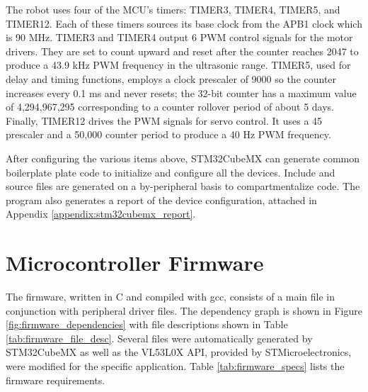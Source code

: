 The robot uses four of the MCU's timers: TIMER3, TIMER4, TIMER5, and TIMER12. Each of these timers sources its base clock from the APB1 clock which is 90 MHz. TIMER3 and TIMER4 output 6 PWM control signals for the motor drivers. They are set to count upward and reset after the counter reaches 2047 to produce a 43.9 kHz PWM frequency in the ultrasonic range. TIMER5, used for delay and timing functions, employs a clock prescaler of 9000 so the counter increases every 0.1 ms and never resets; the 32-bit counter has a maximum value of 4,294,967,295 corresponding to a counter rollover period of about 5 days. Finally, TIMER12 drives the PWM signals for servo control. It uses a 45 prescaler and a 50,000 counter period to produce a 40 Hz PWM frequency.

After configuring the various items above, STM32CubeMX can generate common boilerplate plate code to initialize and configure all the devices. Include and source files are generated on a by-peripheral basis to compartmentalize code. The program also generates a report of the device configuration, attached in Appendix \ref{appendix:stm32cubemx_report}.

\section{Microcontroller Firmware}
The firmware, written in C and compiled with gcc, consists of a main file in conjunction with peripheral driver files. The dependency graph is shown in Figure \ref{fig:firmware_dependencies} with file descriptions shown in Table \ref{tab:firmware_file_desc}. Several files were automatically generated by STM32CubeMX as well as the VL53L0X API, provided by STMicroelectronics, were modified for the specific application. Table \ref{tab:firmware_specs} lists the firmware requirements.

